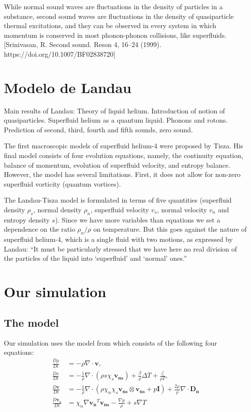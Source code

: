 \documentclass{article}
\begin{document}
While normal sound waves are fluctuations in the density of particles in a substance, second sound waves are fluctuations in the density of quasiparticle thermal excitations, and they can be observed in every system in which momentum is conserved in most phonon-phonon collisions, like superfluids. [Srinivasan, R. Second sound. Reson 4, 16–24 (1999). https://doi.org/10.1007/BF02838720]

\section{Modelo de Landau}
\cite{Kincl}
Main results of Landau:
Theory of liquid helium. Introduction of notion of quasiparticles. Superfluid
helium as a quantum liquid. Phonons and rotons. Prediction of second, third,
fourth and fifth sounds, zero sound.

\cite{PhysRev.60.356}

The first macroscopic models of superfluid helium-4 were
proposed by Tisza. His final model consists of four evolution equations, namely, the continuity equation, balance of momentum, evolution of superfluid velocity, and entropy balance. However, the model has several limitations. First, it does not allow for non-zero superfluid vorticity (quantum vortices). 

The Landau-Tisza model is formulated in terms of five quantities (superfluid density $\rho_s$, normal density $\rho_n$, superfluid velocity $v_s$, normal velocity $v_n$ and entropy density $s$). Since we have more variables than equations we set a dependence on the ratio $\rho_n/\rho$ on temperature. But this goes against the nature of superfluid helium-4, which is a single fluid with two motions, as expressed by Landau: ``It must be particularly stressed that we
have here no real division of the particles of the liquid into `superfluid'
and `normal' ones.''

\section{Our simulation}
\subsection{The model}
Our simulation uses the model from\cite{Kincl} which consists of the following four equations:
\begin{align}
\frac{D\rho}{Dt} &= -\rho \nabla \cdot \mathbf{v}, \\
\frac{Ds}{Dt} &= -\frac{1}{\rho} \nabla \cdot (\rho s \chi_s \mathbf{v_{ns}}) + \frac{\beta}{\rho} \Delta T + \frac{\zeta}{\rho T} ,\\
\frac{D\mathbf{v}}{Dt} &= -\frac{1}{\rho} \nabla \cdot (\rho \chi_n \chi_s \mathbf{v_{ns}} \otimes \mathbf{v_{ns}} + p \mathbf{I}) + \frac{2 \mu}{\rho} \nabla \cdot \mathbf{D_n} \\
\frac{D\mathbf{v_s}}{Dt} &= \chi_n \nabla \mathbf{v_n}^T \mathbf{v_{ns}} - \frac{\nabla p}{\rho} + s \nabla T
\end{align}
\end{document}

